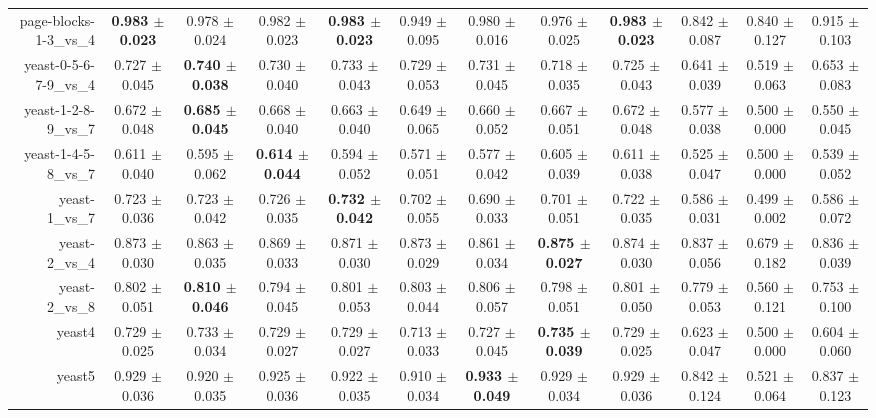 \begin{table}[!ht]
{\begin{tabular}{r c c c c c c c c c c c}
page-blocks-1-3\_vs\_4 & \textbf{0.983 $\pm$ 0.023} & 0.978 $\pm$ 0.024 & 0.982 $\pm$ 0.023 & \textbf{0.983 $\pm$ 0.023} & 0.949 $\pm$ 0.095 & 0.980 $\pm$ 0.016 & 0.976 $\pm$ 0.025 & \textbf{0.983 $\pm$ 0.023} & 0.842 $\pm$ 0.087 & 0.840 $\pm$ 0.127 & 0.915 $\pm$ 0.103 \\
yeast-0-5-6-7-9\_vs\_4 & 0.727 $\pm$ 0.045 & \textbf{0.740 $\pm$ 0.038} & 0.730 $\pm$ 0.040 & 0.733 $\pm$ 0.043 & 0.729 $\pm$ 0.053 & 0.731 $\pm$ 0.045 & 0.718 $\pm$ 0.035 & 0.725 $\pm$ 0.043 & 0.641 $\pm$ 0.039 & 0.519 $\pm$ 0.063 & 0.653 $\pm$ 0.083 \\
yeast-1-2-8-9\_vs\_7 & 0.672 $\pm$ 0.048 & \textbf{0.685 $\pm$ 0.045} & 0.668 $\pm$ 0.040 & 0.663 $\pm$ 0.040 & 0.649 $\pm$ 0.065 & 0.660 $\pm$ 0.052 & 0.667 $\pm$ 0.051 & 0.672 $\pm$ 0.048 & 0.577 $\pm$ 0.038 & 0.500 $\pm$ 0.000 & 0.550 $\pm$ 0.045 \\
yeast-1-4-5-8\_vs\_7 & 0.611 $\pm$ 0.040 & 0.595 $\pm$ 0.062 & \textbf{0.614 $\pm$ 0.044} & 0.594 $\pm$ 0.052 & 0.571 $\pm$ 0.051 & 0.577 $\pm$ 0.042 & 0.605 $\pm$ 0.039 & 0.611 $\pm$ 0.038 & 0.525 $\pm$ 0.047 & 0.500 $\pm$ 0.000 & 0.539 $\pm$ 0.052 \\
yeast-1\_vs\_7 & 0.723 $\pm$ 0.036 & 0.723 $\pm$ 0.042 & 0.726 $\pm$ 0.035 & \textbf{0.732 $\pm$ 0.042} & 0.702 $\pm$ 0.055 & 0.690 $\pm$ 0.033 & 0.701 $\pm$ 0.051 & 0.722 $\pm$ 0.035 & 0.586 $\pm$ 0.031 & 0.499 $\pm$ 0.002 & 0.586 $\pm$ 0.072 \\
yeast-2\_vs\_4 & 0.873 $\pm$ 0.030 & 0.863 $\pm$ 0.035 & 0.869 $\pm$ 0.033 & 0.871 $\pm$ 0.030 & 0.873 $\pm$ 0.029 & 0.861 $\pm$ 0.034 & \textbf{0.875 $\pm$ 0.027} & 0.874 $\pm$ 0.030 & 0.837 $\pm$ 0.056 & 0.679 $\pm$ 0.182 & 0.836 $\pm$ 0.039 \\
yeast-2\_vs\_8 & 0.802 $\pm$ 0.051 & \textbf{0.810 $\pm$ 0.046} & 0.794 $\pm$ 0.045 & 0.801 $\pm$ 0.053 & 0.803 $\pm$ 0.044 & 0.806 $\pm$ 0.057 & 0.798 $\pm$ 0.051 & 0.801 $\pm$ 0.050 & 0.779 $\pm$ 0.053 & 0.560 $\pm$ 0.121 & 0.753 $\pm$ 0.100 \\
yeast4 & 0.729 $\pm$ 0.025 & 0.733 $\pm$ 0.034 & 0.729 $\pm$ 0.027 & 0.729 $\pm$ 0.027 & 0.713 $\pm$ 0.033 & 0.727 $\pm$ 0.045 & \textbf{0.735 $\pm$ 0.039} & 0.729 $\pm$ 0.025 & 0.623 $\pm$ 0.047 & 0.500 $\pm$ 0.000 & 0.604 $\pm$ 0.060 \\
yeast5 & 0.929 $\pm$ 0.036 & 0.920 $\pm$ 0.035 & 0.925 $\pm$ 0.036 & 0.922 $\pm$ 0.035 & 0.910 $\pm$ 0.034 & \textbf{0.933 $\pm$ 0.049} & 0.929 $\pm$ 0.034 & 0.929 $\pm$ 0.036 & 0.842 $\pm$ 0.124 & 0.521 $\pm$ 0.064 & 0.837 $\pm$ 0.123 \\

\end{tabular}}
\end{table}
